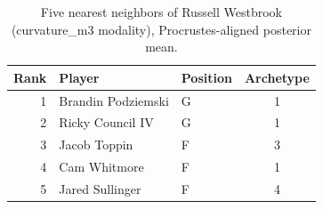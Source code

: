 \begin{table}[htbp]
  \centering\small
  \begin{tabular}{rllc}
    \toprule
    Rank & Player & Position & Archetype \\
    \midrule
    1 & Brandin Podziemski & G & 1 \\
    2 & Ricky Council IV & G & 1 \\
    3 & Jacob Toppin & F & 3 \\
    4 & Cam Whitmore & F & 1 \\
    5 & Jared Sullinger & F & 4 \\
    \bottomrule
  \end{tabular}
  \caption{Five nearest neighbors of Russell Westbrook (curvature_m3 modality), Procrustes-aligned posterior mean.}
  \label{tab:Russell_Westbrook_neighbors_curvature_m3}
\end{table}

